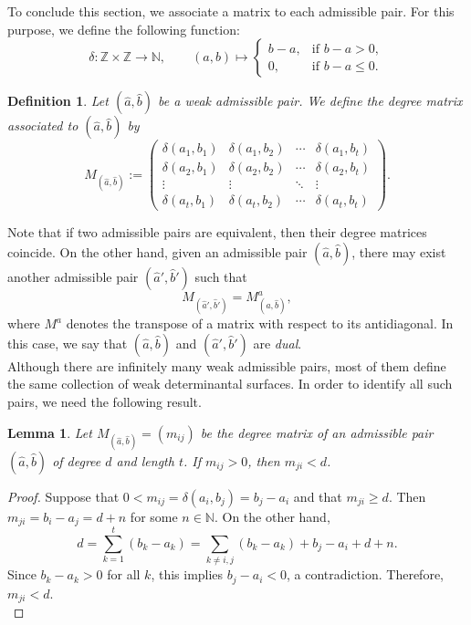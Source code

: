 \documentclass[12pt,reqno]{amsart}
\theoremstyle{plain}
\newtheorem{lem}[theorem]{Lemma}
\newtheorem{defi}[theorem]{Definition}
\theoremstyle{definition}
\theoremstyle{remark}
\theoremstyle{definition}
\begin{document}
To conclude this section, we associate a matrix to each admissible pair. For this purpose, we define the following function:
\[
\delta:\mathds{Z}\times\mathds{Z}\longrightarrow\mathds{N}, \qquad
(a,b)\longmapsto
\begin{cases}
b-a, & \text{if } b-a>0,\\
0, & \text{if } b-a\leq 0.
\end{cases}
\]

\begin{defi}
Let $(\hat{a},\hat{b})$ be a weak admissible pair. We define the degree matrix associated to $(\hat{a},\hat{b})$ by
\[
M_{(\hat{a},\hat{b})}:=
\begin{pmatrix}
\delta(a_1,b_1) & \delta(a_1,b_2) & \cdots & \delta(a_1,b_t)\\
\delta(a_2,b_1) & \delta(a_2,b_2) & \cdots & \delta(a_2,b_t)\\
\vdots & \vdots & \ddots & \vdots\\
\delta(a_t,b_1) & \delta(a_t,b_2) & \cdots & \delta(a_t,b_t)
\end{pmatrix}.
\]
\end{defi}

Note that if two admissible pairs are equivalent, then their degree matrices coincide. On the other hand, given an admissible pair $(\hat{a},\hat{b})$, there may exist another admissible pair $(\hat{a}',\hat{b}')$ such that
\[
M_{(\hat{a}',\hat{b}')} = M_{(\hat{a},\hat{b})}^{a},
\]
where $M^{a}$ denotes the transpose of a matrix with respect to its antidiagonal. In this case, we say that $(\hat{a},\hat{b})$ and $(\hat{a}',\hat{b}')$ are \textit{dual}.\\

Although there are infinitely many weak admissible pairs, most of them define the same collection of weak determinantal surfaces. In order to identify all such pairs, we need the following result.

\begin{lem}
Let $M_{(\hat{a},\hat{b})}=(m_{ij})$ be the degree matrix of an admissible pair $(\hat{a},\hat{b})$ of degree $d$ and length $t$. If $m_{ij}>0$, then $m_{ji}<d$.
\end{lem}

\begin{proof}
Suppose that $0<m_{ij}=\delta(a_i,b_j)=b_j-a_i$ and that $m_{ji}\geq d$. Then $m_{ji}=b_i-a_j=d+n$ for some $n\in\mathds{N}$. On the other hand,
\[
d=\sum_{k=1}^{t}(b_k-a_k)
=\sum_{k\neq i,j}(b_k-a_k)+b_j-a_i+d+n.
\]
Since $b_k-a_k>0$ for all $k$, this implies $b_j-a_i<0$, a contradiction. Therefore, $m_{ji}<d$.\\
\end{proof}
\end{document}

